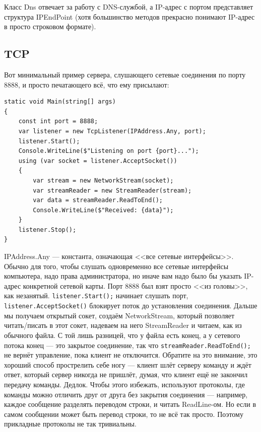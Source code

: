 \documentclass{../../text-style}
\begin{document}
Класс Dns отвечает за работу с DNS-службой, а IP-адрес с портом представляет структура IPEndPoint (хотя большинство методов прекрасно понимают IP-адрес в просто строковом формате).

\subsection{TCP}

Вот минимальный пример сервера, слушающего сетевые соединения по порту 8888, и просто печатающего всё, что ему присылают:

\begin{verbatim}
static void Main(string[] args)
{
    const int port = 8888;
    var listener = new TcpListener(IPAddress.Any, port);
    listener.Start();
    Console.WriteLine($"Listening on port {port}...");
    using (var socket = listener.AcceptSocket())
    {
        var stream = new NetworkStream(socket);
        var streamReader = new StreamReader(stream);
        var data = streamReader.ReadToEnd();
        Console.WriteLine($"Received: {data}");
    }
    listener.Stop();
}
\end{verbatim}

IPAddress.Any --- константа, означающая <<все сетевые интерфейсы>>. Обычно для того, чтобы слушать одновременно все сетевые интерфейсы компьютера, надо права администратора, но иначе вам надо было бы указать IP-адрес конкретной сетевой карты. Порт 8888 был взят просто <<из головы>>, как незанятый. \texttt{listener.Start();} начинает слушать порт, \texttt{listener.AcceptSocket()} блокирует поток до установления соединения. Дальше мы получаем открытый сокет, создаём NetworkStream, который позволяет читать/писать в этот сокет, надеваем на него StreamReader и читаем, как из обычного файла. С той лишь разницей, что у файла есть конец, а у сетевого потока конец --- это закрытое соединение, так что \texttt{streamReader.ReadToEnd();} не вернёт управление, пока клиент не отключится. Обратите на это внимание, это хороший способ прострелить себе ногу --- клиент шлёт серверу команду и ждёт ответ, который сервер никогда не пришлёт, думая, что клиент ещё не закончил передачу команды. Дедлок. Чтобы этого избежать, используют протоколы, где команды можно отличить друг от друга без закрытия соединения --- например, каждое сообщение разделять переводом строки, и читать ReadLine-ом. Но если в самом сообщении может быть перевод строки, то не всё так просто. Поэтому прикладные протоколы не так тривиальны.
\end{document}
